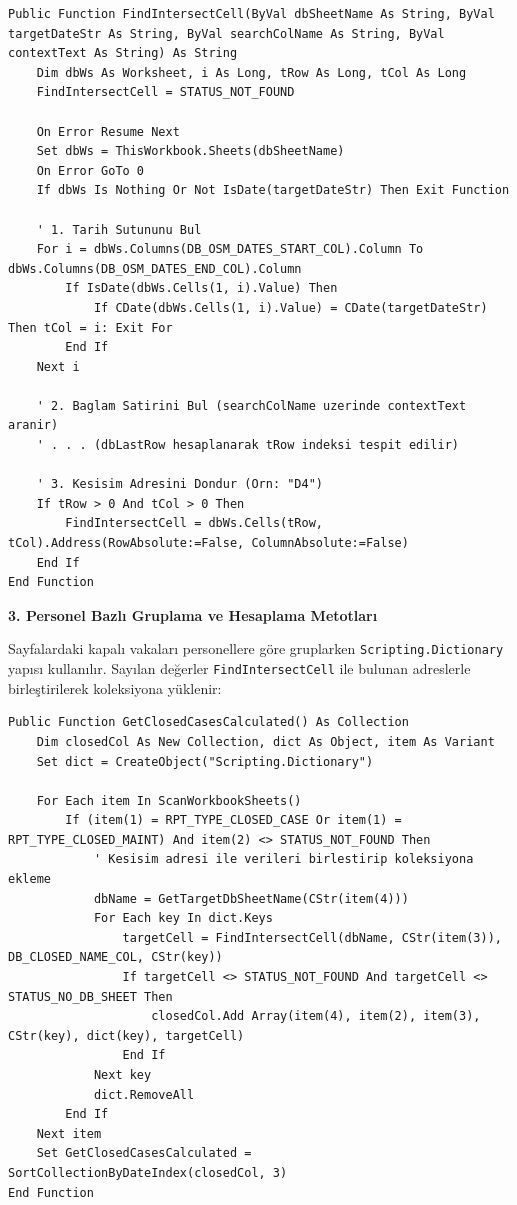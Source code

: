 \begin{lstlisting}[caption={Dinamik Kesişim Adresi Bulma Fonksiyonu}]
Public Function FindIntersectCell(ByVal dbSheetName As String, ByVal targetDateStr As String, ByVal searchColName As String, ByVal contextText As String) As String
    Dim dbWs As Worksheet, i As Long, tRow As Long, tCol As Long
    FindIntersectCell = STATUS_NOT_FOUND
    
    On Error Resume Next
    Set dbWs = ThisWorkbook.Sheets(dbSheetName)
    On Error GoTo 0
    If dbWs Is Nothing Or Not IsDate(targetDateStr) Then Exit Function
    
    ' 1. Tarih Sutununu Bul
    For i = dbWs.Columns(DB_OSM_DATES_START_COL).Column To dbWs.Columns(DB_OSM_DATES_END_COL).Column
        If IsDate(dbWs.Cells(1, i).Value) Then
            If CDate(dbWs.Cells(1, i).Value) = CDate(targetDateStr) Then tCol = i: Exit For
        End If
    Next i
    
    ' 2. Baglam Satirini Bul (searchColName uzerinde contextText aranir)
    ' . . . (dbLastRow hesaplanarak tRow indeksi tespit edilir)
    
    ' 3. Kesisim Adresini Dondur (Orn: "D4")
    If tRow > 0 And tCol > 0 Then
        FindIntersectCell = dbWs.Cells(tRow, tCol).Address(RowAbsolute:=False, ColumnAbsolute:=False)
    End If
End Function
\end{lstlisting}

\vspace{0.3cm}

\textbf{\textcolor{primary}{3. Personel Bazlı Gruplama ve Hesaplama Metotları}}

Sayfalardaki kapalı vakaları personellere göre gruplarken \texttt{Scripting.Dictionary} yapısı kullanılır. Sayılan değerler \texttt{FindIntersectCell} ile bulunan adreslerle birleştirilerek koleksiyona yüklenir:

\begin{lstlisting}[caption={Kapalı Vakaların Personel Bazlı Hesaplama Mimarisi}]
Public Function GetClosedCasesCalculated() As Collection
    Dim closedCol As New Collection, dict As Object, item As Variant
    Set dict = CreateObject("Scripting.Dictionary")
    
    For Each item In ScanWorkbookSheets()
        If (item(1) = RPT_TYPE_CLOSED_CASE Or item(1) = RPT_TYPE_CLOSED_MAINT) And item(2) <> STATUS_NOT_FOUND Then
            ' Kesisim adresi ile verileri birlestirip koleksiyona ekleme
            dbName = GetTargetDbSheetName(CStr(item(4)))
            For Each key In dict.Keys
                targetCell = FindIntersectCell(dbName, CStr(item(3)), DB_CLOSED_NAME_COL, CStr(key))
                If targetCell <> STATUS_NOT_FOUND And targetCell <> STATUS_NO_DB_SHEET Then
                    closedCol.Add Array(item(4), item(2), item(3), CStr(key), dict(key), targetCell)
                End If
            Next key
            dict.RemoveAll
        End If
    Next item
    Set GetClosedCasesCalculated = SortCollectionByDateIndex(closedCol, 3)
End Function
\end{lstlisting}

